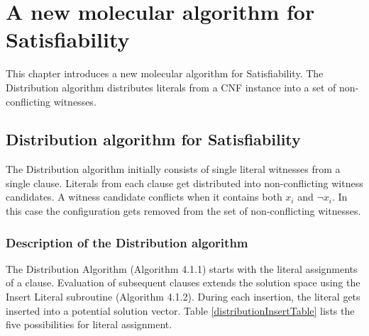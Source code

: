 
\chapter{A new molecular algorithm for {\sc Satisfiability}}

This chapter introduces a new molecular algorithm for {\sc Satisfiability}.  The Distribution algorithm distributes literals from a CNF instance into a set of non-conflicting witnesses.

\section{Distribution algorithm for {\sc Satisfiability}}

The Distribution algorithm initially consists of single literal witnesses from a single clause.  Literals from each clause get distributed into non-conflicting witness candidates.  A witness candidate conflicts when it contains both $x_i$ and $\neg x_i$.  In this case the configuration gets removed from the set of non-conflicting witnesses.  

	\subsection{Description of the Distribution algorithm}
		

The {\sc Distribution Algorithm} (Algorithm 4.1.1) starts with the literal assignments of a clause.  Evaluation of subsequent clauses extends the solution space using the {\sc Insert Literal} subroutine (Algorithm 4.1.2).  During each insertion, the literal gets inserted into a potential solution vector.  Table \ref{distributionInsertTable} lists the five possibilities for literal assignment.



\FloatBarrier
	

